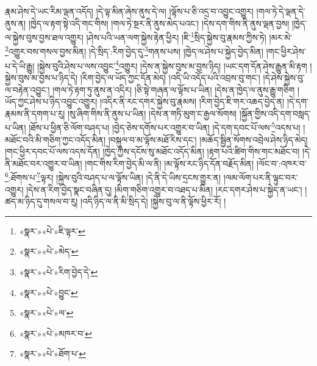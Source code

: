 རྣམ་ཤེས་དེ་ཡང་རིམ་ལྡན་འདོད། །དེ་ལྟ་མིན་ཞེས་ནུས་དེ་ལ། །ལྟོས་པ་ཅི་འདྲ་བ་འབྱུང་འགྱུར། །གལ་ཏེ་དེ་ལྡན་དེ་ནུས་ན། །ཁྱེད་ལ་རྟག་སྟེ་འདི་གང་གིས། །གལ་ཏེ་སྔར་ནི་ནུས་མེད་པའང་། །དེས་དག་གིས་ནི་ནུས་ལྡན་བྱས། །ཁྱེད་ལ་སྐྱེས་བུས་བྱས་ཐལ་འགྱུར། །ཤེས་པའི་ཡན་ལག་སྐྱེས་རྟེན་ཕྱིར། །ཇི་\footnote{«སྣར་»«པེ་»ཇི་ལྟར་}སྲིད་སྐྱེས་བུ་རྣམས་ཀྱིས་ཏེ། །མར་མེ་\footnote{«སྣར་»«པེ་»མེད་}འགྱུར་བས་གསལ་བྱས་མིན། །དེ་སྲིད་:རིག་བྱེད་དུ་\footnote{«སྣར་»«པེ་»རིག་བྱེད་དེ་}གནས་པས། །ཁྱེད་ལ་ཤེས་པ་སྐྱེད་བྱེད་མིན། །གང་ཕྱིར་ཤེས་པ་དེ་ཡི་རྒྱུ། །སྐྱེས་བུའི་ཤེས་པ་ལས་འབྱུང་\footnote{«སྣར་»«པེ་»བྱུང་}འགྱུར། །དེས་ན་སྐྱེས་བུས་མ་བྱས་ཉིད། །ཡང་དག་དོན་ཤེས་རྒྱུན་མི་རྟག །སྐྱེས་བུས་མ་བྱས་པ་ཉིད་དེ། །རིག་བྱེད་ལ་ཡོད་ཀྱང་དོན་མེད། །འདི་ཡི་འདོད་པའི་འབྲས་བུ་གང་། །དེ་ཤེས་སྐྱེས་བུ་ལ་བརྟེན་འབྱུང་། །གལ་ཏེ་རྟག་ཏུ་ནུས་ན་འདིར། །ཅི་སྟེ་གཞན་ལ་ལྟོས་པ་ཡིན། །དེས་ན་ཁྱེད་ལ་ནུས་རྒྱུ་གཅིག །ཡོད་ཀྱང་ཤེས་པ་ཉིད་འབྱུང་འགྱུར། །འདིར་ནི་རང་དགར་སྐྱེས་བུ་རྣམས། །རིག་བྱེད་ཇི་གར་འཆད་བྱེད་ན། །དེ་དག་རྣམས་ནི་དགག་པ་རུ། །སུ་ཞིག་གིས་ནི་ནུས་པ་ཡིན། །དེས་ན་གཏི་མུག་ང་རྒྱལ་སོགས། །སྐྱོན་གྱིས་འདི་དག་བསླད་པ་ཡིན། །ཐོས་པ་ཕྱིན་ཅི་ལོག་བཤད་པ། །བྱེད་ཅེས་དགོས་པར་འགྱུར་བ་ཡིན། །དེ་དག་དབང་པོ་ལས་\footnote{«སྣར་»«པེ་»ལ་}འདས་པ། །མཐོང་བའི་མི་གཅིག་ཀྱང་འདོད་མིན། །བསྐུལ་བ་མ་ལྟོས་མཐོ་རིས་དང་། །མཆོད་སྦྱིན་སོགས་འབྲེལ་ཤེས་ཉིད་མེད། །གང་ཕྱིར་དབང་པོ་ལས་འདས་དོན། །ཁྱེད་ཀྱིས་དངོས་སུ་མཐོང་འདོད་མིན། །རྟག་པའི་ཚིག་གིས་གང་མཐོང་བ། །དེ་ནི་མཐོང་བར་འགྱུར་བ་ཡིན། །གང་གིས་རིག་བྱེད་མི་ལ་ནི། །མ་ལྟོས་རང་ཉིད་དོན་བརྗོད་མིན། །ལོང་བ་:འཁར་བ་\footnote{«སྣར་»«པེ་»མཁར་བ་}:ཐོགས་པ་\footnote{«སྣར་»«པེ་»ཐོག་པ་}ལྟར། །སྐྱེས་བུའི་བཤད་པ་ལ་ལྟོས་ཡིན། །དེ་ནི་དེ་ཡིས་དྲངས་གྱུར་ན། །ལམ་ལོག་པར་ནི་ལྟུང་བར་འགྱུར། །དེས་ན་རིག་བྱེད་སྣང་བཞིན་དུ། །མིག་གཅིག་འགྱུར་བ་འཐད་པ་མིན། །རང་དགར་ཤེས་པ་སྐྱེད་ན་ཡང་། །ཚད་མ་ཉིད་དུ་གསལ་བ་རུ། །འདི་ཉིད་ལ་ནི་མི་སྲིད་དེ། །སྐྱེས་བུ་ལ་ནི་ལྟོས་ཕྱིར་རོ། །
